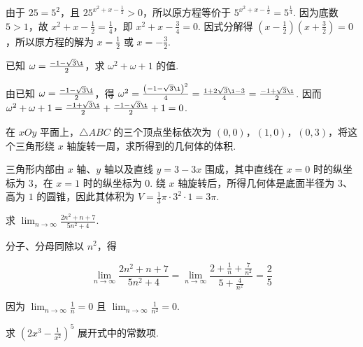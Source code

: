 \begin{solution}
由于 \(25=5^2\)，且 \(25^{x^2+x-\frac{1}{2}}>0\)，所以原方程等价于 \(5^{x^2+x-\frac{1}{2}}=5^{\frac{1}{4}}\). 因为底数 \(5>1\)，故 \(x^2+x-\frac{1}{2}=\frac{1}{4}\)，即 \(x^2+x-\frac{3}{4}=0\). 因式分解得 \(\left(x-\frac{1}{2}\right)\left(x+\frac{3}{2}\right)=0\)，所以原方程的解为 \(x=\frac{1}{2}\) 或 \(x=-\frac{3}{2}\).
\end{solution}

\begin{problem}
已知 \(\omega = \frac{-1 - \sqrt{3}\i}{2}\)，求 \(\omega^2 + \omega + 1\) 的值.
\end{problem}

\begin{solution}
由已知 \(\omega=\frac{-1-\sqrt{3}\i}{2}\)，得 \(\omega^2=\frac{\left(-1-\sqrt{3}\i\right)^2}{4}=\frac{1+2\sqrt{3}\i-3}{4}=\frac{-1+\sqrt{3}\i}{2}\). 因而 \(\omega^2+\omega+1=\frac{-1+\sqrt{3}\i}{2}+\frac{-1-\sqrt{3}\i}{2}+1=0\).
\end{solution}

\begin{problem}
在 \(xOy\) 平面上，\(\triangle ABC\) 的三个顶点坐标依次为 \((0,0)\)，\((1,0)\)，\((0,3)\)，将这个三角形绕 \(x\) 轴旋转一周，求所得到的几何体的体积.
\end{problem}

\begin{solution}
三角形内部由 \(x\) 轴、\(y\) 轴以及直线 \(y=3-3x\) 围成，其中直线在 \(x=0\) 时的纵坐标为 \(3\)，在 \(x=1\) 时的纵坐标为 \(0\). 绕 \(x\) 轴旋转后，所得几何体是底面半径为 \(3\)、高为 \(1\) 的圆锥，因此其体积为 \(V=\frac{1}{3}\pi\cdot3^2\cdot1=3\pi\).
\end{solution}

\begin{problem}
求 \(\displaystyle\lim_{n\to\infty}\frac{2n^2 + n + 7}{5n^2 + 4}\).
\end{problem}

\begin{solution}
分子、分母同除以 \(n^2\)，得

\[
\displaystyle\lim_{n\to\infty}\frac{2n^2+n+7}{5n^2+4}=\displaystyle\lim_{n\to\infty}\frac{2+\frac{1}{n}+\frac{7}{n^2}}{5+\frac{4}{n^2}}=\frac{2}{5}
\]

因为 \(\displaystyle\lim_{n\to\infty}\frac{1}{n}=0\) 且 \(\displaystyle\lim_{n\to\infty}\frac{1}{n^2}=0\).
\end{solution}

\begin{problem}
求 \(\left(2x^3 - \frac{1}{x^2}\right)^5\) 展开式中的常数项.
\end{problem}

